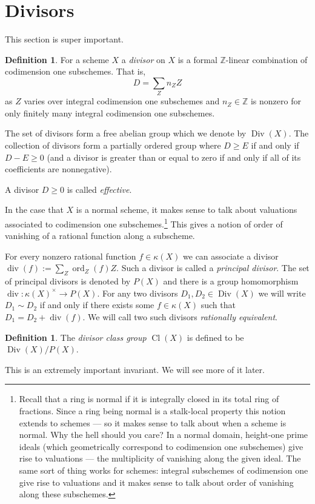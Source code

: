 \documentclass[12pt]{article}
\numberwithin{equation}{section}
\theoremstyle{definition}
\newtheorem{definition}[theorem]{Definition}
\theoremstyle{remark}
\newcommand{\ZZ}{\mathbb{Z}}
\newcommand{\ord}{\operatorname{ord}}
\newcommand{\Div}{\operatorname{Div}}
\renewcommand{\div}{\operatorname{div}}
\newcommand{\Cl}{\operatorname{Cl}}
\begin{document}
\section{Divisors}
This section is super important.
\begin{definition}
	For a scheme $X$ a \emph{divisor} on $X$ is a formal $\ZZ$-linear combination of codimension one subschemes. That is, 
	$$ D = \sum_Z n_Z Z $$
	as $Z$ varies over integral codimension one subschemes and $n_Z \in \ZZ$ is nonzero for only finitely many integral codimension one subschemes.
\end{definition}
The set of divisors form a free abelian group which we denote by $\Div(X)$.
The collection of divisors form a partially ordered group where $D\geq E$ if and only if $D-E\geq 0$ (and a divisor is greater than or equal to zero if and only if all of its coefficients are nonnegative).

A divisor $D\geq 0$ is called \emph{effective}.

In the case that $X$ is a normal scheme, it makes sense to talk about valuations associated to codimension one subschemes.\footnote{
		Recall that a ring is normal if it is integrally closed in its total ring of fractions. 
		Since a ring being normal is a stalk-local property this notion extends to schemes --- so it makes sense to talk about when a scheme is normal. 
		Why the hell should you care? In a normal domain, height-one prime ideals (which geometrically correspond to codimension one subschemes) give rise to valuations --- the multiplicity of vanishing along the given ideal. 
		The same sort of thing works for schemes: integral subschemes of codimension one give rise to valuations and it makes sense to talk about order of vanishing along these subschemes.
	} This gives a notion of order of vanishing of a rational function along a subscheme.

 For every nonzero rational function $f \in \kappa(X)$ we can associate a divisor $\div(f) := \sum_{Z} \ord_Z(f) Z$. 
	Such a divisor is called a \emph{principal divisor}. 
	The set of principal divisors is denoted by $P(X)$ and there is a group homomorphism $\div: \kappa(X)^{\times} \to P(X)$.
	For any two divisors $D_1,D_2\in \Div(X)$ we will write $D_1\sim D_2$ if and only if there exists some $f\in \kappa(X)$ such that $D_1 = D_2 + \div(f)$. 
	We will call two such divisors \emph{rationally equivalent}.
\begin{definition}
The \emph{divisor class group} $\Cl(X)$ is defined to be $\Div(X)/P(X)$. 
\end{definition}
This is an extremely important invariant. We will see more of it later.
\end{document}
